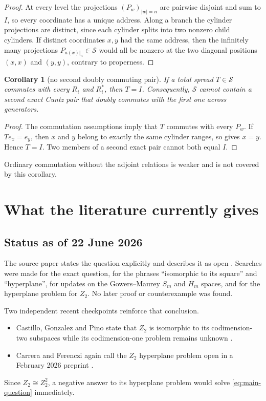 \documentclass[11pt]{article}
\newtheorem{corollary}[theorem]{Corollary}
\theoremstyle{definition}
\theoremstyle{remark}
\begin{document}
\begin{proof}
At every level the projections $(P_w)_{|w|=n}$ are pairwise disjoint and sum to
$I$, so every coordinate has a unique address.  Along a branch the cylinder
projections are distinct, since each cylinder splits into two nonzero child
cylinders.  If distinct coordinates $x,y$ had the same address, then the
infinitely many projections $P_{a(x)|_n}\in\mathscr S$ would all be nonzero at
the two diagonal positions $(x,x)$ and $(y,y)$, contrary to properness.
\end{proof}

\begin{corollary}[no second doubly commuting pair]\label{cor:double-commuting}
If a total spread $T\in\mathscr S$ commutes with every $R_i$ and $R_i^*$, then
$T=I$.  Consequently, $\mathscr S$ cannot contain a second exact Cuntz pair
that doubly commutes with the first one across generators.
\end{corollary}

\begin{proof}
The commutation assumptions imply that $T$ commutes with every $P_w$.  If
$Te_x=e_y$, then $x$ and $y$ belong to exactly the same cylinder ranges, so
 gives $x=y$.  Hence $T=I$.  Two members of a second exact
pair cannot both equal $I$.
\end{proof}

Ordinary commutation without the adjoint relations is weaker and is not covered
by this corollary.

\section{What the literature currently gives}

\subsection{Status as of 22 June 2026}

The source paper states the question explicitly and describes it as open
\cite[Question 2.15]{AlbiacAnsorena2026}.  Searches were made for the exact
question, for the phrases ``isomorphic to its square'' and ``hyperplane'', for
updates on the Gowers--Maurey $S_m$ and $H_m$ spaces, and for the hyperplane
problem for $Z_2$.  No later proof or counterexample was found.

Two independent recent checkpoints reinforce that conclusion.
\begin{itemize}[leftmargin=1.6em]
\item Castillo, Gonzalez and Pino state that $Z_2$ is isomorphic to its
codimension-two subspaces while its codimension-one problem remains unknown
\cite{CastilloGonzalezPino2025}.
\item Carrera and Ferenczi again call the $Z_2$ hyperplane problem open in a
February 2026 preprint \cite{CarreraFerenczi2026}.
\end{itemize}
Since $Z_2\cong Z_2^2$, a negative answer to its hyperplane problem would solve
\eqref{eq:main-question} immediately.
\end{document}
